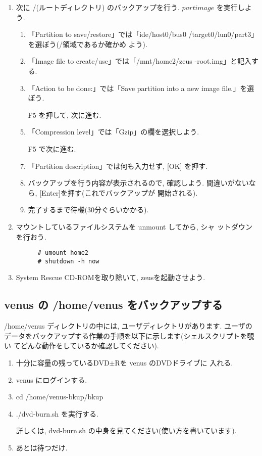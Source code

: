 \documentclass{jarticle}
\begin{document}
\begin{enumerate}
\item 次に /(ルートディレクトリ) のバックアップを行う.
      $partimage$ を実行しよう.

      \begin{enumerate}
      \item 「Partition to save/restore」では「ide/host0/bus0
             /target0/lun0/part3」を選ぼう(/領域であるか確かめ
             よう).
      \item 「Image file to create/use」では「/mnt/home2/zeus
             -root.img」と記入する.
      \item 「Action to be done:」では「Save partition into a
             new image file.」を選ぼう.
      \item [F5]を押して, 次に進む.
      \item 「Compression level」では「Gzip」の欄を選択しよう.
      \item [F5]で次に進む.
      \item 「Partition description」では何も入力せず, [OK]
            を押す.
      \item バックアップを行う内容が表示されるので, 確認しよう.
            間違いがないなら, [Enter]を押す(これでバックアップが
            開始される).
      \item 完了するまで待機(30分ぐらいかかる).
      \end{enumerate}

\item マウントしているファイルシステムを unmount してから, シャ
      ットダウンを行おう.

      \begin{verbatim}
      # umount home2
      # shutdown -h now
      \end{verbatim}

\item System Rescue CD-ROMを取り除いて, zeusを起動させよう.
\end{enumerate}

\subsection{venus の /home/venus をバックアップする \label{sub:vns-b}}

/home/venus ディレクトリの中には, ユーザディレクトリがあります. ユーザの
データをバックアップする作業の手順を以下に示します(シェルスクリプトを覗い
てどんな動作をしているか確認してください).

\begin{enumerate}
\item 十分に容量の残っているDVD$\pm$Rを venus のDVDドライブに
      入れる.
\item venus にログインする.
\item cd /home/venus-bkup/bkup
\item ./dvd-burn.sh を実行する.

      詳しくは, dvd-burn.sh の中身を見てください(使い方を書いています).

\item あとは待つだけ.
\end{enumerate}
\end{document}
